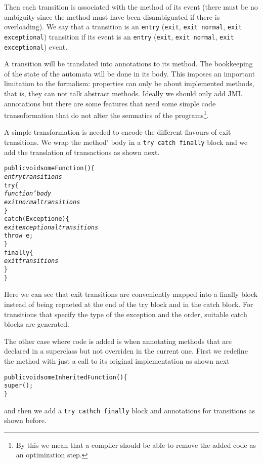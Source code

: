 \documentclass[a4paper,10pt]{article}
\theoremstyle{definition}
\begin{document}
Then each transition is associated with the method of its event (there must be no ambiguity since the method
must have been disambiguated if there is overloading).
We say that a transition is an \texttt{entry} (\texttt{exit}, \texttt{exit normal}, \texttt{exit exceptional})
transition if its event is an \texttt{entry} (\texttt{exit}, \texttt{exit normal}, \texttt{exit exceptional})
event.

A transition will be translated into annotations to its method. The bookkeeping of the state of the automata
will be done in its body.
This imposes an important limitation to the formalism: properties can only be about implemented methods, that
is, they can not talk abstract methods. Ideally we should only add JML annotations but there are some features
that need some simple code transoformation that do not alter the semnatics of the programs\footnote{By this we
mean that a compiler should be able to remove the added code as an optimization step.}.

A simple transformation is needed to encode the different flavours of exit transitions. We wrap the method'
body in a \texttt{try catch finally} block and we add the translation of transactions as shown next.

\begin{alltt}
public void someFunction() \{
  \textit{entry transitions}
  try \{
    \textit{function' body}
    \textit{exit normal transitions}
  \}
  catch (Exception e) \{
    \textit{exit exceptional transitions}
    \texttt{throw e;}
  \}
  finally \{
    \textit{exit transitions}
  \}
\}
\end{alltt}

Here we can see that exit transitions are conveniently mapped into a finally block instead of being repaeted
at the end of the try block and in the catch block. For transitions that specify the type of the exception and
the order, suitable catch blocks are generated.

The other case where code is added is when annotating methods that are declared in a superclass  but not
overriden in the current one. First we redefine the method with just a call to its original implementation as
shown next
\begin{alltt}
public void someInheritedFunction() \{
  super();
\}
\end{alltt}
and then we add a \texttt{try cathch finally} block and annotations for transitions as shown before.
\end{document}
